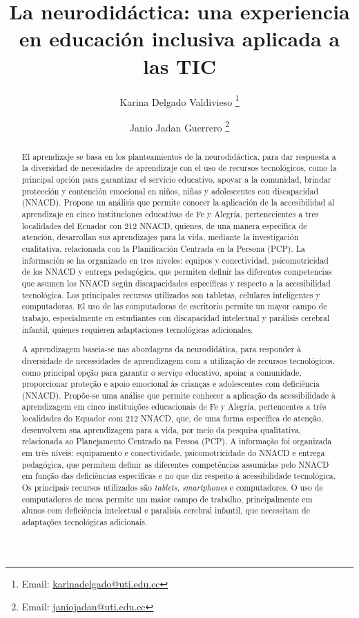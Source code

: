 \documentclass[spanish]{textolivre}
\title{La neurodidáctica: una experiencia en educación inclusiva aplicada a las TIC}
\author[1]{Karina Delgado Valdivieso \orcid{0000-0001-7459-1905} \thanks{Email: \href{mailto:karinadelgado@uti.edu.ec}{karinadelgado@uti.edu.ec}}}
\author[2]{Janio Jadan Guerrero  \orcid{0000-0002-3616-2074} \thanks{Email: \href{mailto:janiojadan@uti.edu.ec}{janiojadan@uti.edu.ec}}}
\affil[1]{Universidad Tecnológica Indoamerica, Facultad de Ciencias Humanas, de la Educación y Desarrollo Social, Ecuador.}
\affil[2]{Universidad Tecnológica Indoamerica, Centro de Mecatrónica y Sistemas Interactivos, Ecuador.}
\begin{document}
\maketitle

\begin{polyabstract}
\begin{abstract}
El aprendizaje se basa en los planteamientos de la neurodidáctica, para dar respuesta a la diversidad de necesidades de aprendizaje con el uso de recursos tecnológicos, como la principal opción para garantizar el servicio educativo, apoyar a la comunidad, brindar protección y contención emocional en niños, niñas y adolescentes con discapacidad (NNACD). Propone un análisis que permite conocer la aplicación de la accesibilidad al aprendizaje en cinco instituciones educativas de Fe y Alegría, pertenecientes a tres localidades del Ecuador con 212 NNACD, quienes, de una manera específica de atención, desarrollan sus aprendizajes para la vida, mediante la investigación cualitativa, relacionada con la Planificación Centrada en la Persona (PCP). La información se ha organizado en tres niveles: equipos y conectividad, psicomotricidad de los NNACD y entrega pedagógica, que permiten definir las diferentes competencias que asumen los NNACD según discapacidades específicas y respecto a la accesibilidad tecnológica. Los principales recursos utilizados son tabletas, celulares inteligentes y computadoras. El uso de las computadoras de escritorio permite un mayor campo de trabajo, especialmente en estudiantes con discapacidad intelectual y parálisis cerebral infantil, quienes requieren adaptaciones tecnológicas adicionales.

\end{abstract}

\begin{portuguese}
\begin{abstract}
A aprendizagem baseia-se nas abordagens da neurodidática, para responder à diversidade de necessidades de aprendizagem com a utilização de recursos tecnológicos, como principal opção para garantir o serviço educativo, apoiar a comunidade, proporcionar proteção e apoio emocional às crianças e adolescentes com deficiência (NNACD). Propõe-se uma análise que permite conhecer a aplicação da acessibilidade à aprendizagem em cinco instituições educacionais de Fe y Alegría, pertencentes a três localidades do Equador com 212 NNACD, que, de uma forma específica de atenção, desenvolvem sua aprendizagem para a vida, por meio da pesquisa qualitativa, relacionada ao Planejamento Centrado na Pessoa (PCP). A informação foi organizada em três níveis: equipamento e conectividade, psicomotricidade do NNACD e entrega pedagógica, que permitem definir as diferentes competências assumidas pelo NNACD em função das deficiências específicas e no que diz respeito à acessibilidade tecnológica. Os principais recursos utilizados são \textit{tablets}, \textit{smartphones} e computadores. O uso de computadores de mesa permite um maior campo de trabalho, principalmente em alunos com deficiência intelectual e paralisia cerebral infantil, que necessitam de adaptações tecnológicas adicionais.


\end{abstract}
\end{portuguese}
\end{polyabstract}
\end{document}
